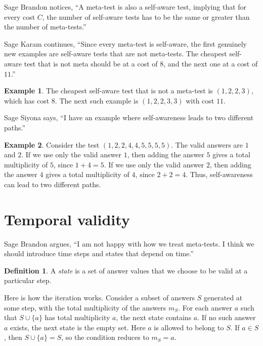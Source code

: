 \documentclass[12pt,reqno]{article}
\theoremstyle{plain}
\theoremstyle{definition}
\newtheorem{definition}{Definition}
\newtheorem{example}{Example}
\theoremstyle{remark}
\begin{document}
Sage Brandon notices, ``A meta-test is also a self-aware test, implying that for every cost $C$, the number of self-aware tests has to be the same or greater than the number of meta-tests.''





Sage Karam continues, ``Since every meta-test is self-aware, the first genuinely new examples are self-aware tests that are not meta-tests. The cheapest self-aware test that is not meta should be at a cost of $8$, and the next one at a cost of $11$.''

\begin{example}
The cheapest self-aware test that is not a meta-test is $(1,2,2,3)$, which has cost $8$. The next such example is $(1,2,2,3,3)$ with cost $11$.
\end{example}

Sage Siyona says, ``I have an example where self-awareness leads to two different paths.''

\begin{example}
Consider the test $(1,2,2,4,4,5,5,5,5)$. The valid answers are $1$ and $2$.
If we use only the valid answer $1$, then adding the answer $5$ gives a total
multiplicity of $5$, since $1+4=5$. If we use only the valid answer $2$, then
adding the answer $4$ gives a total multiplicity of $4$, since $2+2=4$.
Thus, self-awareness can lead to two different paths.
\end{example}


\section*{Temporal validity}

Sage Brandon argues, ``I am not happy with how we treat meta-tests. I think we should introduce time steps and states that depend on time.''

\begin{definition}
    A \textit{state} is a set of answer values that we choose to be valid at a particular step.
\end{definition}

Here is how the iteration works. Consider a subset of answers $S$ generated at some step, with the total multiplicity of the answers $m_S$. For each answer $a$ such that $S \cup \{a\}$ has total multiplicity $a$, the next state contains $a$. If no such answer $a$ exists, the next state is the empty set. Here $a$ is allowed to belong to $S$. If $a\in S$, then $S\cup\{a\}=S$, so the condition reduces to $m_S=a$.
\end{document}
